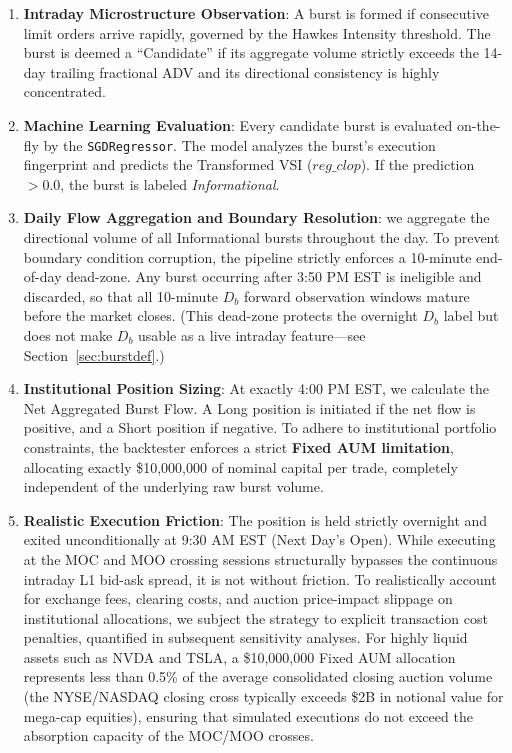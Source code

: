 \documentclass[11pt]{article}
\begin{document}
\begin{enumerate}
    \item \textbf{Intraday Microstructure Observation}: A burst is formed if consecutive limit orders arrive rapidly, governed by the Hawkes Intensity threshold. The burst is deemed a ``Candidate'' if its aggregate volume strictly exceeds the 14-day trailing fractional ADV and its directional consistency is highly concentrated.
    \item \textbf{Machine Learning Evaluation}: Every candidate burst is evaluated on-the-fly by the \texttt{SGDRegressor}. The model analyzes the burst's execution fingerprint and predicts the Transformed VSI ($reg\_clop$). If the prediction $> 0.0$, the burst is labeled \textit{Informational}.
    \item \textbf{Daily Flow Aggregation and Boundary Resolution}: we aggregate the directional volume of all Informational bursts throughout the day. To prevent boundary condition corruption, the pipeline strictly enforces a 10-minute end-of-day dead-zone. Any burst occurring after 3:50 PM EST is ineligible and discarded, so that all 10-minute $D_b$ forward observation windows mature before the market closes. (This dead-zone protects the overnight $D_b$ label but does not make $D_b$ usable as a live intraday feature---see Section~\ref{sec:burstdef}.)
    \item \textbf{Institutional Position Sizing}: At exactly 4:00 PM EST, we calculate the Net Aggregated Burst Flow. A Long position is initiated if the net flow is positive, and a Short position if negative. To adhere to institutional portfolio constraints, the backtester enforces a strict \textbf{Fixed AUM limitation}, allocating exactly \$10,000,000 of nominal capital per trade, completely independent of the underlying raw burst volume.
    \item \textbf{Realistic Execution Friction}: The position is held strictly overnight and exited unconditionally at 9:30 AM EST (Next Day's Open). While executing at the MOC and MOO crossing sessions structurally bypasses the continuous intraday L1 bid-ask spread, it is not without friction. To realistically account for exchange fees, clearing costs, and auction price-impact slippage on institutional allocations, we subject the strategy to explicit transaction cost penalties, quantified in subsequent sensitivity analyses. For highly liquid assets such as NVDA and TSLA, a \$10,000,000 Fixed AUM allocation represents less than 0.5\% of the average consolidated closing auction volume (the NYSE/NASDAQ closing cross typically exceeds \$2B in notional value for mega-cap equities), ensuring that simulated executions do not exceed the absorption capacity of the MOC/MOO crosses.
\end{enumerate}
\end{document}
